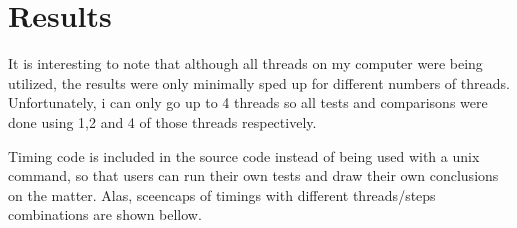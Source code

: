 \documentclass{article}
\begin{document}
\section*{Results}
It is interesting to note that although all threads on my computer were being utilized, 
the results were only minimally sped up for different numbers of threads.
Unfortunately, i can only go up to 4 threads so all tests and comparisons were done using 1,2 and 4 of those threads respectively.

Timing code is included in the source code instead of being used with a unix command, so that users can run their own tests and draw their own conclusions on the matter.
Alas, sceencaps of timings with different threads/steps combinations are shown bellow.
\end{document}
